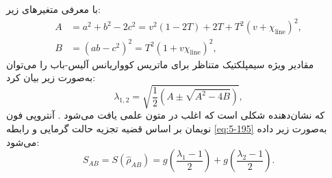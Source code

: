 با معرفی متغیرهای زیر:
\begin{equation}
	\begin{aligned}
		A &= a^2 + b^2 - 2c^2 = v^2(1 - 2T) + 2T + T^2(v + \chi_{\text{line}})^2, \\
		B &= (ab - c^2)^2 = T^2(1 + v\chi_{\text{line}})^2,
		\label{eq:6-117}
	\end{aligned}
\end{equation}
مقادیر ویژه سیمپلکتیک متناظر برای ماتریس کوواریانس آلیس-باب را می‌توان به‌صورت زیر بیان کرد:
\begin{equation}
	\lambda_{1,2} = \sqrt{\frac{1}{2} (A \pm \sqrt{A^2 - 4B})},
	\label{eq:6-118}
\end{equation}
که نشان‌دهنده شکلی است که اغلب در متون علمی یافت می‌شود \cite{129, 130, 131, 150, 151}. آنتروپی فون نویمان بر اساس قضیه تجزیه حالت گرمایی و رابطه \eqref{eq:5-195} به‌صورت زیر داده می‌شود:
\begin{equation}
	S_{AB} = S(\hat{\rho}_{AB}) = g\left(\frac{\lambda_1 - 1}{2}\right) + g\left(\frac{\lambda_2 - 1}{2}\right).
	\label{eq:6-119}
\end{equation}	

